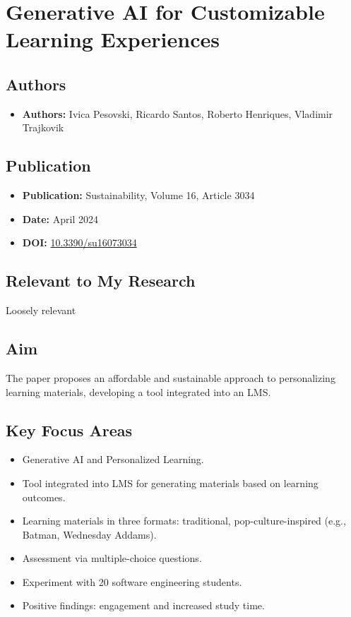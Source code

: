 \section{Generative AI for Customizable Learning Experiences}

\subsection{Authors}
\begin{itemize}
    \item \textbf{Authors:} Ivica Pesovski, Ricardo Santos, Roberto Henriques, Vladimir Trajkovik
\end{itemize}

\subsection{Publication}
\begin{itemize}
    \item \textbf{Publication:} Sustainability, Volume 16, Article 3034
    \item \textbf{Date:} April 2024
    \item \textbf{DOI:} \href{https://doi.org/10.3390/su16073034}{10.3390/su16073034}
\end{itemize}

\subsection{Relevant to My Research}
Loosely relevant

\subsection{Aim}
The paper proposes an affordable and sustainable approach to personalizing learning materials, developing a tool integrated into an LMS.

\subsection{Key Focus Areas}
\begin{itemize}
    \item Generative AI and Personalized Learning.
    \item Tool integrated into LMS for generating materials based on learning outcomes.
    \item Learning materials in three formats: traditional, pop-culture-inspired (e.g., Batman, Wednesday Addams).
    \item Assessment via multiple-choice questions.
    \item Experiment with 20 software engineering students.
    \item Positive findings: engagement and increased study time.
\end{itemize}

